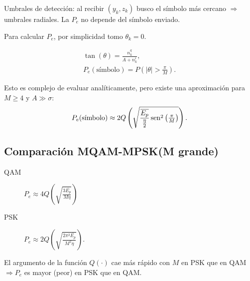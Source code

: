 Umbrales de detección: al recibir $(y_k,z_k)$ busco el símbolo más
cercano $\Rightarrow$ umbrales radiales. La $P_e$ no depende del
símbolo enviado.



Para calcular $P_e$, por simplicidad tomo
$\theta_k=0$.

\begin{minipage}{0.5\textwidth}
\end{minipage}\hfil
\begin{minipage}{0.5\textwidth}
\begin{gather*}
    \tan(\theta)=\frac{n^q_k}{A+n^i_k},\\
    P_e(\text{símbolo}) = P\left(|\theta|>\frac{\pi}{M}\right).
\end{gather*}
\end{minipage}

Esto es complejo de evaluar analíticamente, pero existe una
aproximación para $M\geq 4$ y $A \gg \sigma$:
\[P_e(\text{símbolo})\approx 2 Q\left(\sqrt{\frac{\overline{E_p}}{\frac{\eta}{2}}\operatorname{sen}^2\left(\tfrac{\pi}{M}\right)}\right).\]


\subsection*{Comparación MQAM-MPSK(M grande)}

\begin{description}
    \item[QAM] $P_e\approx 4 Q\left(\sqrt{\frac{3\overline{E_p}}{M\eta}}\right)$
    \item[PSK] $P_e\approx 2 Q\left(\sqrt{\frac{2\pi^2\overline{E_p}}{M^2\eta}}\right)$.
 \end{description}
El argumento de la función $Q(\cdot)$ cae más rápido con $M$ en
PSK que en QAM $\Longrightarrow P_e$ es mayor (peor) en PSK que en QAM.

